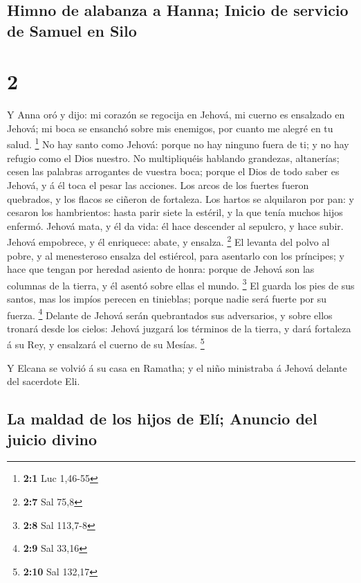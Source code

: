 \hypertarget{himno-de-alabanza-a-hanna-inicio-de-servicio-de-samuel-en-silo}{%
\subsection{Himno de alabanza a Hanna; Inicio de servicio de Samuel en
Silo}\label{himno-de-alabanza-a-hanna-inicio-de-servicio-de-samuel-en-silo}}

\hypertarget{section-1}{%
\section{2}\label{section-1}}

 Y Anna oró y dijo: mi corazón se regocija en Jehová, mi
cuerno es ensalzado en Jehová; mi boca se ensanchó sobre mis enemigos,
por cuanto me alegré en tu salud. \footnote{\textbf{2:1} Luc 1,46-55}
 No hay santo como Jehová: porque no hay ninguno fuera de
ti; y no hay refugio como el Dios nuestro.  No
multipliquéis hablando grandezas, altanerías; cesen las palabras
arrogantes de vuestra boca; porque el Dios de todo saber es Jehová, y á
él toca el pesar las acciones.  Los arcos de los fuertes
fueron quebrados, y los flacos se ciñeron de fortaleza. 
Los hartos se alquilaron por pan: y cesaron los hambrientos: hasta parir
siete la estéril, y la que tenía muchos hijos enfermó. 
Jehová mata, y él da vida: él hace descender al sepulcro, y hace subir.
 Jehová empobrece, y él enriquece: abate, y ensalza.
\footnote{\textbf{2:7} Sal 75,8}  El levanta del polvo al
pobre, y al menesteroso ensalza del estiércol, para asentarlo con los
príncipes; y hace que tengan por heredad asiento de honra: porque de
Jehová son las columnas de la tierra, y él asentó sobre ellas el mundo.
\footnote{\textbf{2:8} Sal 113,7-8}  El guarda los pies de
sus santos, mas los impíos perecen en tinieblas; porque nadie será
fuerte por su fuerza. \footnote{\textbf{2:9} Sal 33,16} 
Delante de Jehová serán quebrantados sus adversarios, y sobre ellos
tronará desde los cielos: Jehová juzgará los términos de la tierra, y
dará fortaleza á su Rey, y ensalzará el cuerno de su Mesías. \footnote{\textbf{2:10}
  Sal 132,17}

 Y Elcana se volvió á su casa en Ramatha; y el niño
ministraba á Jehová delante del sacerdote Eli.

\hypertarget{la-maldad-de-los-hijos-de-eluxed-anuncio-del-juicio-divino}{%
\subsection{La maldad de los hijos de Elí; Anuncio del juicio
divino}\label{la-maldad-de-los-hijos-de-eluxed-anuncio-del-juicio-divino}}

